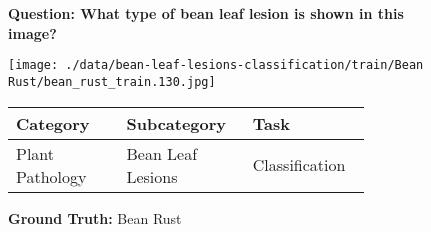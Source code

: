 
    \begin{figure}[t!]
        \small
        \textbf{Question: What type of bean leaf lesion is shown in this image?}
        \vspace{1em}
        \begin{center}
        \texttt{[image: ./data/bean-leaf-lesions-classification/train/Bean Rust/bean\_rust\_train.130.jpg]}
        \end{center}
        \vspace{1em}
        
        \begin{tabular}{|p{0.28\linewidth}|p{0.28\linewidth}|p{0.28\linewidth}|}
            \hline
            \textbf{Category} & \textbf{Subcategory} & \textbf{Task} \\
            \hline
            Plant Pathology & Bean Leaf Lesions & Classification \\
            \hline
        \end{tabular}
        \vspace{1em}

        \textbf{Ground Truth:} Bean Rust
        \vspace{1em}


\end{figure}
